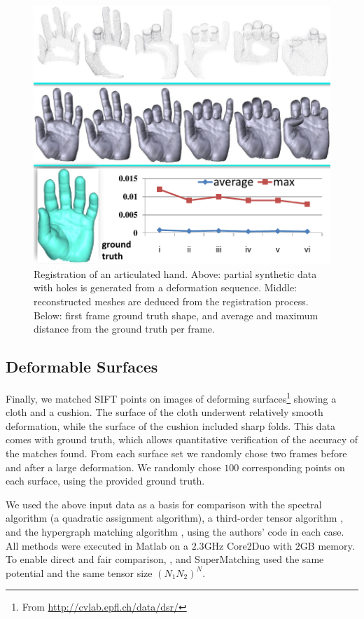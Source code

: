 \begin{figure}[t!]
\centering
  \includegraphics[width=0.95\linewidth]{figures/3DHand.pdf}
  \caption{Registration of an articulated hand.
  Above: partial synthetic data with holes is generated from a deformation sequence.
  Middle: reconstructed meshes are deduced from the registration process.
  Below: first frame ground truth shape, and average and maximum distance from the ground truth per frame.}
\label{fig:3DHand}
\end{figure}

\subsection{Deformable Surfaces}
\label{subsec:2DDeformable}

Finally, we matched SIFT points on images of deforming surfaces\footnote{From \url{http://cvlab.epfl.ch/data/dsr/}} showing a cloth and a cushion.
The surface of the cloth underwent relatively smooth deformation, while the surface of the cushion included sharp folds.
This data comes with ground truth, which allows quantitative verification of the accuracy of the matches found.
From each surface set we randomly chose two frames before and after a large deformation.
We randomly chose $100$ corresponding points on each surface, using the provided ground truth.

We used the above input data as a basis for comparison with the spectral algorithm \cite{Cour06} (a quadratic assignment algorithm),
a third-order tensor algorithm \cite{Duchenne09},
and the hypergraph matching algorithm \cite{Zass08}, using the authors' code in each case.
All methods were executed in Matlab on a $2.3$GHz Core2Duo with $2$GB memory.
To enable direct and fair comparison,
\cite{Duchenne09}, \cite{Zass08} and SuperMatching used the same potential and the same tensor size $(N_1N_2)^N$.

